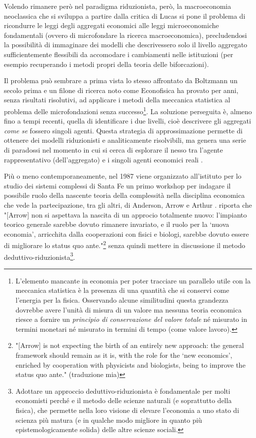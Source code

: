 \documentclass[a4paper, headings=standardclasses]{scrartcl}
\begin{document}
Volendo rimanere però nel paradigma riduzionista, però, la macroeconomia neoclassica che si sviluppa a partire dalla critica di Lucas si pone il problema di ricondurre le leggi degli aggregati economici alle leggi microeconomiche fondamentali (ovvero di microfondare la ricerca macroeconomica), precludendosi la possibilità di immaginare dei modelli che descrivessero solo il livello aggregato sufficientemente flessibili da accomodare i cambiamenti nelle istituzioni (per esempio recuperando i metodi propri della teoria delle biforcazioni).

Il problema può sembrare a prima vista lo stesso affrontato da Boltzmann un secolo prima e un filone di ricerca noto come Econofisica ha provato per anni, senza risultati risolutivi, ad applicare i metodi della meccanica statistica al problema delle microfondazioni senza successo\footnote{L'elemento mancante in economia per poter tracciare un parallelo utile con la meccanica statistica è la presenza di una quantità che si conservi come l'energia per la fisica. Osservando alcune similitudini questa grandezza dovrebbe avere l'unità di misura di un valore ma nessuna teoria economica riesce a fornire un \textit{principio di conservazione del valore totale} né misurato in termini monetari né misurato in termini di tempo (come valore lavoro).}.
La soluzione perseguita è, almeno fino a tempi recenti, quella di identificare i due livelli, cioè descrivere gli aggregati \textit{come se} fossero singoli agenti. Questa strategia di approssimazione permette di ottenere dei modelli riduzionisti e analiticamente risolvibili, ma genera una serie di paradossi nel momento in cui si cerca di esplorare il nesso tra l'agente rappresentativo (dell'aggregato) e i singoli agenti economici reali \parencite{kirman1992}.

Più o meno contemporaneamente, nel 1987 viene organizzato all'istituto per lo studio dei sistemi complessi di Santa Fe un primo workshop per indagare il possibile ruolo della nascente teoria della complessità nella disciplina economica che vede la partecipazione, tra gli altri, di Anderson, Arrow e Arthur \parencite{fontana2010a}.
\citeauthor{fontana2010a} riporta che "[Arrow] non si aspettava la nascita di un approcio totalmente nuovo: l'impianto teorico generale sarebbe dovuto rimanere invariato, e il ruolo per la `nuova economia', arricchita dalla cooperazioni con fisici e biologi, sarebbe dovuto essere di migliorare lo status quo ante."\footnote{"[Arrow] is not expecting the birth of an entirely new approach: the general framework should remain as it is, with the role for the `new economics', enriched by cooperation with physicists and biologists, being to improve the status quo ante." (traduzione mia)} \parencite{fontana2010a} senza quindi mettere in discussione il metodo deduttivo-riduzionista\footnote{Adottare un approccio deduttivo-riduzionista è fondamentale per molti economisti perché e il metodo delle scienze naturali (e soprattutto della fisica), che permette nella loro visione di elevare l'economia a uno stato di scienza più matura (e in qualche modo migliore in quanto più epistemologicamente solida) delle altre scienze sociali.}.
\end{document}
